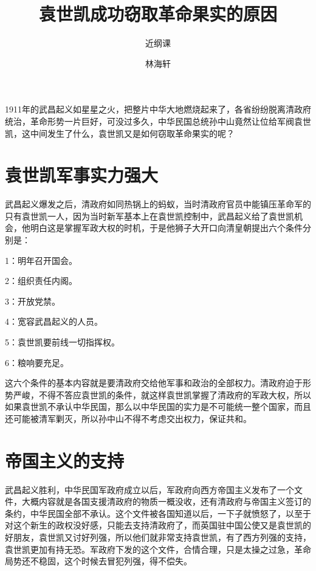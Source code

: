 \documentclass[10pt,a4paper]{beamer} %
\begin{document}
	
	\title{袁世凯成功窃取革命果实的原因}
	\subtitle{近纲课}
	\author{林海轩}
	\date{}
	
	\begin{frame}
		\titlepage
	\end{frame}
	
	\begin{frame}
		\tableofcontents
	\end{frame}
	
	
	
	\begin{frame}
		1911年的武昌起义如星星之火，把整片中华大地燃烧起来了，各省纷纷脱离清政府统治，革命形势一片巨好，可没过多久，中华民国总统孙中山竟然让位给军阀袁世凯，这中间发生了什么，袁世凯又是如何窃取革命果实的呢？
	\end{frame}
	
	\section{袁世凯军事实力强大}
	\begin{frame}
		武昌起义爆发之后，清政府如同热锅上的蚂蚁，当时清政府官员中能镇压革命军的只有袁世凯一人，因为当时新军基本上在袁世凯控制中，武昌起义给了袁世凯机会，他明白这是掌握军政大权的时机，于是他狮子大开口向清皇朝提出六个条件分别是：
		
		1：明年召开国会。
		
		2：组织责任内阁。
		
		3：开放党禁。
		
		4：宽容武昌起义的人员。
		
		5：袁世凯要前线一切指挥权。
		
		6：粮响要充足。
		
		这六个条件的基本内容就是要清政府交给他军事和政治的全部权力。清政府迫于形势严峻，不得不答应袁世凯的条件，就这样袁世凯掌握了清政府的军政大权，所以如果袁世凯不承认中华民国，那么以中华民国的实力是不可能统一整个国家，而且还可能被清军剿灭，所以孙中山不得不考虑交出权力，保证共和。
		
		
	\end{frame}
	
	\section{帝国主义的支持}
	\begin{frame}
		武昌起义胜利，中华民国军政府成立以后，军政府向西方帝国主义发布了一个文件，大概内容就是各国支援清政府的物质一概没收，还有清政府与帝国主义签订的条约，中华民国全部不承认。这个文件被各国知道以后，一下子就愤怒了，以至于对这个新生的政权没好感，只能去支持清政府了，而英国驻中国公使又是袁世凯的好朋友，袁世凯又讨好列强，所以他们就非常支持袁世凯，有了西方列强的支持，袁世凯更加有持无恐。军政府下发的这个文件，合情合理，只是太操之过急，革命局势还不稳固，这个时候去冒犯列强，得不偿失。
	\end{frame}
	
\end{document}
